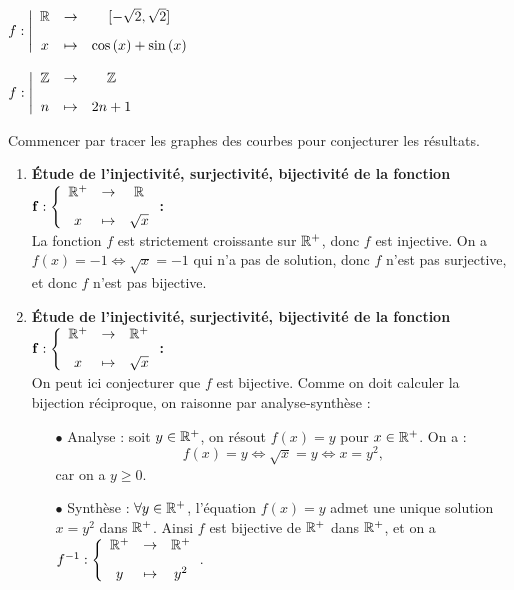 \documentclass[a4paper, 11pt,reqno]{article}
\begin{document}
\begin{exercice}
\begin{enumerate}
\begin{minipage}[t]{0.36\textwidth}
			\item $f:\left|\begin{array}{ccc} \R&\rightarrow& \lbrack -\sqrt{2},\sqrt{2}\rbrack \vsec\\ x & \mapsto & \cos{(x)}+\sin{(x)}\end{array}\right.$
			\item $f:\left|\begin{array}{ccc} \Z&\rightarrow& \Z \vsec\\ n & \mapsto & 2n+1\end{array}\right.$
		\end{minipage}
	\end{enumerate}
\end{exercice}
\begin{correction} \;
	Commencer par tracer les graphes des courbes pour conjecturer les r\'esultats.
	\begin{enumerate}
		\item \textbf{\'Etude de l'injectivit\'e, surjectivit\'e, bijectivit\'e de la fonction $\mathbf{f:\left\lbrace\begin{array}{ccc} \R^+&\rightarrow& \R\vsec\\ x & \mapsto & \sqrt{x}\end{array}\right.}$:}\\
		      La fonction $f$ est strictement croissante sur $\mathbb{R}^+$, donc $f$ est injective.
		      On a $f(x) = -1 \Leftrightarrow \sqrt{x}=-1$ qui n'a pas de solution, donc $f$ n'est pas surjective, et donc $f$ n'est pas bijective.
		\item  \textbf{\'Etude de l'injectivit\'e, surjectivit\'e, bijectivit\'e de la fonction $\mathbf{f:\left\lbrace\begin{array}{ccc} \R^+&\rightarrow& \R^+\vsec\\ x & \mapsto & \sqrt{x}\end{array}\right.}$:}\\
		      On peut ici conjecturer que $f$ est bijective. Comme on doit calculer la bijection r\'eciproque, on raisonne par analyse-synth\`ese :
		      \begin{itemize}
			      \item[$\bullet$] Analyse : soit $y \in \mathbb{R}^+$, on r\'esout $f(x)=y$ pour $x \in \mathbb{R}^+$. On a :
				      $$f(x) = y \Leftrightarrow \sqrt{x} = y \Leftrightarrow x=y^2,$$
				      car on a $y\geq 0$.
			      \item[$\bullet$] Synth\`ese : $\forall y \in \mathbb{R}^+$, l'\'equation $f(x)=y$ admet une unique solution $x=y^2$ dans $\mathbb{R}^+$. Ainsi $f$ est bijective de $\mathbb{R}^+$ dans $\mathbb{R}^+$, et on a $f^{-1} : \left\lbrace\begin{array}{ccc} \R^+&\rightarrow& \R^+\vsec\\ y & \mapsto & y^2 \end{array}\right.$.

\end{itemize}
\end{enumerate}
\end{correction}
\end{document}
